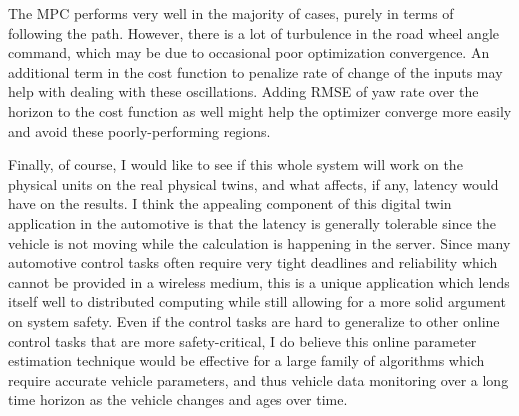 The MPC performs very well in the majority of cases, purely in terms of following the path. However, there is a lot of turbulence in the road wheel angle command, which may be due to occasional poor optimization convergence. An additional term in the cost function to penalize rate of change of the inputs may help with dealing with these oscillations. Adding RMSE of yaw rate over the horizon to the cost function as well might help the optimizer converge more easily and avoid these poorly-performing regions.

Finally, of course, I would like to see if this whole system will work on the physical units on the real physical twins, and what affects, if any, latency would have on the results. I think the appealing component of this digital twin application in the automotive is that the latency is generally tolerable since the vehicle is not moving while the calculation is happening in the server. Since many automotive control tasks often require very tight deadlines and reliability which cannot be provided in a wireless medium, this is a unique application which lends itself well to distributed computing while still allowing for a more solid argument on system safety. Even if the control tasks are hard to generalize to other online control tasks that are more safety-critical, I do believe this online parameter estimation technique would be effective for a large family of algorithms which require accurate vehicle parameters, and thus vehicle data monitoring over a long time horizon as the vehicle changes and ages over time.
